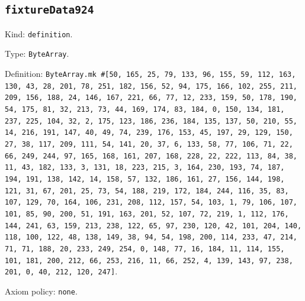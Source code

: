 \documentclass[11pt]{article}
\begin{document}
\subsection*{\texttt{fixtureData924}}
\noindent Kind: \texttt{definition}.\par
\noindent Type: \texttt{ByteArray}.\par
\noindent Definition: \texttt{ByteArray.mk \#[50, 165, 25, 79, 133, 96, 155, 59, 112, 163, 130, 43, 28, 201, 78, 251, 182, 156, 52, 94, 175, 166, 102, 255, 211, 209, 156, 188, 24, 146, 167, 221, 66, 77, 12, 233, 159, 50, 178, 190, 54, 175, 81, 32, 213, 73, 44, 169, 174, 83, 184, 0, 150, 134, 181, 237, 225, 104, 32, 2, 175, 123, 186, 236, 184, 135, 137, 50, 210, 55, 14, 216, 191, 147, 40, 49, 74, 239, 176, 153, 45, 197, 29, 129, 150, 27, 38, 117, 209, 111, 54, 141, 20, 37, 6, 133, 58, 77, 106, 71, 22, 66, 249, 244, 97, 165, 168, 161, 207, 168, 228, 22, 222, 113, 84, 38, 11, 43, 182, 133, 3, 131, 18, 223, 215, 3, 164, 230, 193, 74, 187, 194, 191, 138, 142, 14, 158, 57, 132, 186, 161, 27, 156, 144, 198, 121, 31, 67, 201, 25, 73, 54, 188, 219, 172, 184, 244, 116, 35, 83, 107, 129, 70, 164, 106, 231, 208, 112, 157, 54, 103, 1, 79, 106, 107, 101, 85, 90, 200, 51, 191, 163, 201, 52, 107, 72, 219, 1, 112, 176, 144, 241, 63, 159, 213, 238, 122, 65, 97, 230, 120, 42, 101, 204, 140, 118, 100, 122, 48, 138, 149, 38, 94, 54, 198, 200, 114, 233, 47, 214, 71, 71, 188, 20, 233, 249, 254, 0, 148, 77, 16, 184, 11, 114, 155, 101, 181, 200, 212, 66, 253, 216, 11, 66, 252, 4, 139, 143, 97, 238, 201, 0, 40, 212, 120, 247]}.\par
\noindent Axiom policy: \texttt{none}.\par
\end{document}

